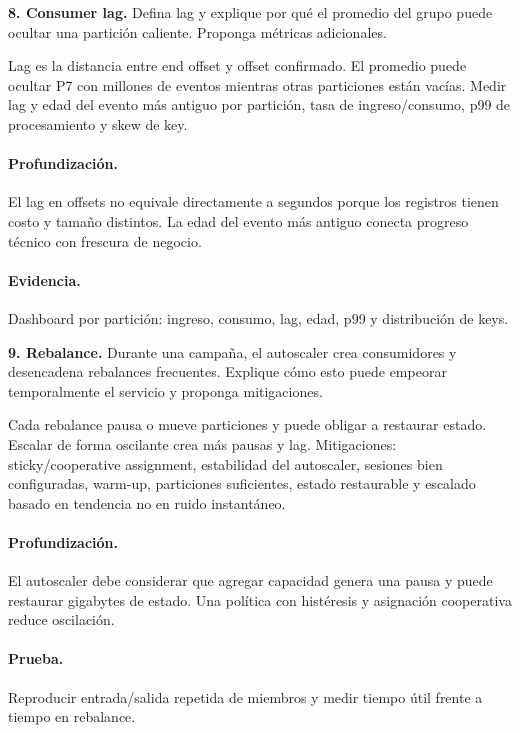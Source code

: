 \documentclass[variant=guiaresuelta,cover=institutional,mode=screen]{ua-engineering-v6-article}
\begin{document}
\begin{uaexercise}
\textbf{8. Consumer lag.} Defina lag y explique por qué el promedio del grupo puede ocultar una partición caliente. Proponga métricas adicionales.
\end{uaexercise}
\begin{uaanswer}
Lag es la distancia entre end offset y offset confirmado. El promedio puede ocultar P7 con millones de eventos mientras otras particiones están vacías. Medir lag y edad del evento más antiguo por partición, tasa de ingreso/consumo, p99 de procesamiento y skew de key.

\paragraph{Profundización.} El lag en offsets no equivale directamente a segundos porque los registros tienen costo y tamaño distintos. La edad del evento más antiguo conecta progreso técnico con frescura de negocio.\paragraph{Evidencia.} Dashboard por partición: ingreso, consumo, lag, edad, p99 y distribución de keys.
\end{uaanswer}
\begin{uaexercise}
\textbf{9. Rebalance.} Durante una campaña, el autoscaler crea consumidores y desencadena rebalances frecuentes. Explique cómo esto puede empeorar temporalmente el servicio y proponga mitigaciones.
\end{uaexercise}
\begin{uaanswer}
Cada rebalance pausa o mueve particiones y puede obligar a restaurar estado. Escalar de forma oscilante crea más pausas y lag. Mitigaciones: sticky/cooperative assignment, estabilidad del autoscaler, sesiones bien configuradas, warm-up, particiones suficientes, estado restaurable y escalado basado en tendencia no en ruido instantáneo.

\paragraph{Profundización.} El autoscaler debe considerar que agregar capacidad genera una pausa y puede restaurar gigabytes de estado. Una política con histéresis y asignación cooperativa reduce oscilación.\paragraph{Prueba.} Reproducir entrada/salida repetida de miembros y medir tiempo útil frente a tiempo en rebalance.
\end{uaanswer}
\end{document}
